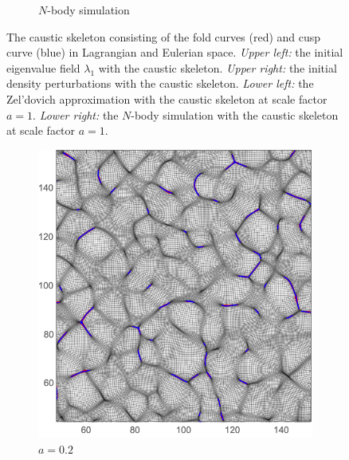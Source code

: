 \documentclass[a4paper, 11pt]{article}
\begin{document}
\begin{figure}
\begin{subfigure}[b]{0.49\textwidth}
\caption{$N$-body simulation}
\end{subfigure}
\caption{The caustic skeleton consisting of the fold curves (red) and cusp curve (blue) in Lagrangian and Eulerian space. \textit{Upper left:} the initial eigenvalue field $\lambda_1$ with the caustic skeleton. \textit{Upper right:} the initial density perturbations with the caustic skeleton. \textit{Lower left:} the Zel'dovich approximation with the caustic skeleton at scale factor $a=1$. \textit{Lower right:} the $N$-body simulation with the caustic skeleton at scale factor $a=1$.}\label{fig:Eulerian}
\end{figure}

\begin{figure}
\centering
\begin{subfigure}[b]{0.49\textwidth}
\includegraphics[width=\textwidth]{Evolution_020}
\caption{$a=0.2$}
\end{subfigure}~
\begin{subfigure}[b]{0.49\textwidth}

\end{subfigure}
\end{figure}
\end{document}
